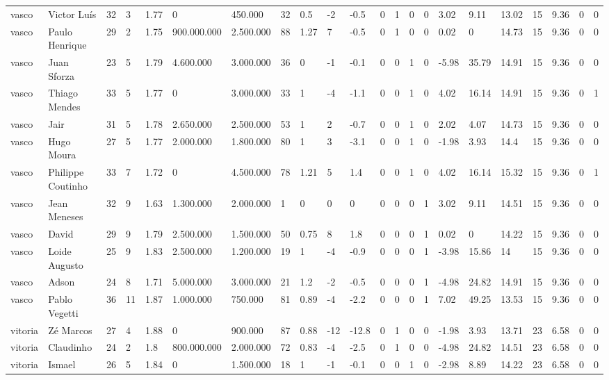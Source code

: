 \begin{longtable}{llllllllllllllllllllll}
vasco & Victor Luís & 32 & 3 & 1.77 & 0 & 450.000 & 32 & 0.5 & -2 & -0.5 & 0 & 1 & 0 & 0 & 3.02 & 9.11 & 13.02 & 15 & 9.36 & 0 & 0 \\
vasco & Paulo Henrique & 29 & 2 & 1.75 & 900.000.000 & 2.500.000 & 88 & 1.27 & 7 & -0.5 & 0 & 1 & 0 & 0 & 0.02 & 0 & 14.73 & 15 & 9.36 & 0 & 0 \\
vasco & Juan Sforza & 23 & 5 & 1.79 & 4.600.000 & 3.000.000 & 36 & 0 & -1 & -0.1 & 0 & 0 & 1 & 0 & -5.98 & 35.79 & 14.91 & 15 & 9.36 & 0 & 0 \\
vasco & Thiago Mendes & 33 & 5 & 1.77 & 0 & 3.000.000 & 33 & 1 & -4 & -1.1 & 0 & 0 & 1 & 0 & 4.02 & 16.14 & 14.91 & 15 & 9.36 & 0 & 1 \\
vasco & Jair & 31 & 5 & 1.78 & 2.650.000 & 2.500.000 & 53 & 1 & 2 & -0.7 & 0 & 0 & 1 & 0 & 2.02 & 4.07 & 14.73 & 15 & 9.36 & 0 & 0 \\
vasco & Hugo Moura & 27 & 5 & 1.77 & 2.000.000 & 1.800.000 & 80 & 1 & 3 & -3.1 & 0 & 0 & 1 & 0 & -1.98 & 3.93 & 14.4 & 15 & 9.36 & 0 & 0 \\
vasco & Philippe Coutinho & 33 & 7 & 1.72 & 0 & 4.500.000 & 78 & 1.21 & 5 & 1.4 & 0 & 0 & 1 & 0 & 4.02 & 16.14 & 15.32 & 15 & 9.36 & 0 & 1 \\
vasco & Jean Meneses & 32 & 9 & 1.63 & 1.300.000 & 2.000.000 & 1 & 0 & 0 & 0 & 0 & 0 & 0 & 1 & 3.02 & 9.11 & 14.51 & 15 & 9.36 & 0 & 0 \\
vasco & David & 29 & 9 & 1.79 & 2.500.000 & 1.500.000 & 50 & 0.75 & 8 & 1.8 & 0 & 0 & 0 & 1 & 0.02 & 0 & 14.22 & 15 & 9.36 & 0 & 0 \\
vasco & Loide Augusto & 25 & 9 & 1.83 & 2.500.000 & 1.200.000 & 19 & 1 & -4 & -0.9 & 0 & 0 & 0 & 1 & -3.98 & 15.86 & 14 & 15 & 9.36 & 0 & 0 \\
vasco & Adson & 24 & 8 & 1.71 & 5.000.000 & 3.000.000 & 21 & 1.2 & -2 & -0.5 & 0 & 0 & 0 & 1 & -4.98 & 24.82 & 14.91 & 15 & 9.36 & 0 & 0 \\
vasco & Pablo Vegetti & 36 & 11 & 1.87 & 1.000.000 & 750.000 & 81 & 0.89 & -4 & -2.2 & 0 & 0 & 0 & 1 & 7.02 & 49.25 & 13.53 & 15 & 9.36 & 0 & 0 \\
vitoria & Zé Marcos & 27 & 4 & 1.88 & 0 & 900.000 & 87 & 0.88 & -12 & -12.8 & 0 & 1 & 0 & 0 & -1.98 & 3.93 & 13.71 & 23 & 6.58 & 0 & 0 \\
vitoria & Claudinho & 24 & 2 & 1.8 & 800.000.000 & 2.000.000 & 72 & 0.83 & -4 & -2.5 & 0 & 1 & 0 & 0 & -4.98 & 24.82 & 14.51 & 23 & 6.58 & 0 & 0 \\
vitoria & Ismael & 26 & 5 & 1.84 & 0 & 1.500.000 & 18 & 1 & -1 & -0.1 & 0 & 0 & 1 & 0 & -2.98 & 8.89 & 14.22 & 23 & 6.58 & 0 & 0 \\

\end{longtable}
